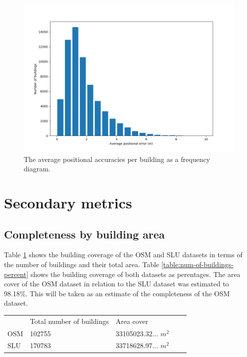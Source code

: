 \documentclass{kththesis}
\begin{document}
\begin{figure}[H]
    \centering
    \includegraphics[width=\textwidth,height=0.5\textheight,keepaspectratio]{img_pos_error_plot}
    \caption{The average positional accuracies per building as a frequency diagram.}
    \label{fig:bar-plot-positional-accuracy}
\end{figure}

\section{Secondary metrics}

\subsection{Completeness by building area}

Table \ref{table:num-of-buildings} shows the building coverage of the OSM and SLU datasets in terms of the number of buildings and their total area.
Table \ref{table:num-of-buildings-percent} shows the building coverage of both datasets as perentages.
The area cover of the OSM dataset in relation to the SLU dataset was estimated to 98.18\%. This will be taken as an estimate of the completeness of the OSM dataset.

\begin{table}[H]
    \begin{tabular}{lllll}
        & Total number of buildings & Area cover \\
        OSM & 102755 & 33105023.32... $m^2$ \\
        SLU & 170783 & 33718628.97... $m^2$
    \end{tabular}
    \label{table:num-of-buildings}
\end{table}
\end{document}
